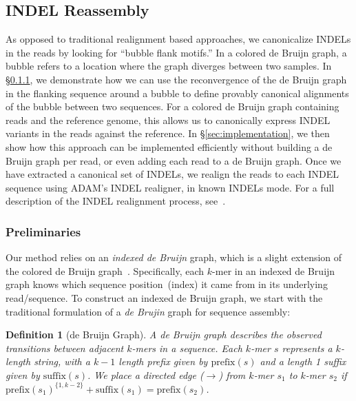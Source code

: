 \documentclass{bioinfo}
\newtheorem{defn}{Definition}
\begin{document}
\begin{methods}
\subsection{INDEL Reassembly}
\label{sec:indel-reassembly}

As opposed to traditional realignment based approaches, we canonicalize INDELs
in the reads by looking for ``bubble flank motifs.'' In a colored de Bruijn
graph, a bubble refers to a location where the graph diverges between two
samples. In \S\ref{sec:formulation}, we demonstrate how we can use the
reconvergence of the de Bruijn graph in the flanking sequence around a bubble
to define provably canonical alignments of the bubble between two sequences.
For a colored de Bruijn graph containing reads and the reference genome, this
allows us to canonically express INDEL variants in the reads against the
reference. In \S\ref{sec:implementation}, we then show how this approach
can be implemented efficiently without building a de Bruijn graph per read,
or even adding each read to a de Bruijn graph. Once we have extracted a
canonical set of INDELs, we realign the reads to each INDEL sequence using
\textsc{ADAM}'s INDEL realigner, in known INDELs mode. For a full description
of the INDEL realignment process, see~\citet{nothaft15avocado}.

\subsubsection{Preliminaries}
\label{sec:formulation}

Our method relies on an \emph{indexed de Bruijn} graph, which is a slight
extension of the colored de Bruijn graph~\citep{iqbal12}. Specifically, each
$k$-mer in an indexed de Bruijn graph knows which sequence position~(index)
it came from in its underlying read/sequence. To construct an indexed de
Bruijn graph, we start with the traditional formulation of a \emph{de Brujin}
graph for sequence assembly:

\begin{defn}[de Bruijn Graph]
\label{defn:dbg}
A de Bruijn graph describes the observed transitions between adjacent $k$-mers in a sequence. Each
$k$-mer $s$ represents a $k$-length string, with a $k - 1$ length prefix given by $\text{prefix}(s)$ and a
length 1 suffix given by $\text{suffix}(s)$. We place a directed edge ($\rightarrow$) from $k$-mer $s_1$ to
$k$-mer $s_2$ if $\text{prefix}(s_1)^{\{1, k - 2\}} + \text{suffix}(s_1) = \text{prefix}(s_2)$.
\end{defn}


\end{methods}
\end{document}
